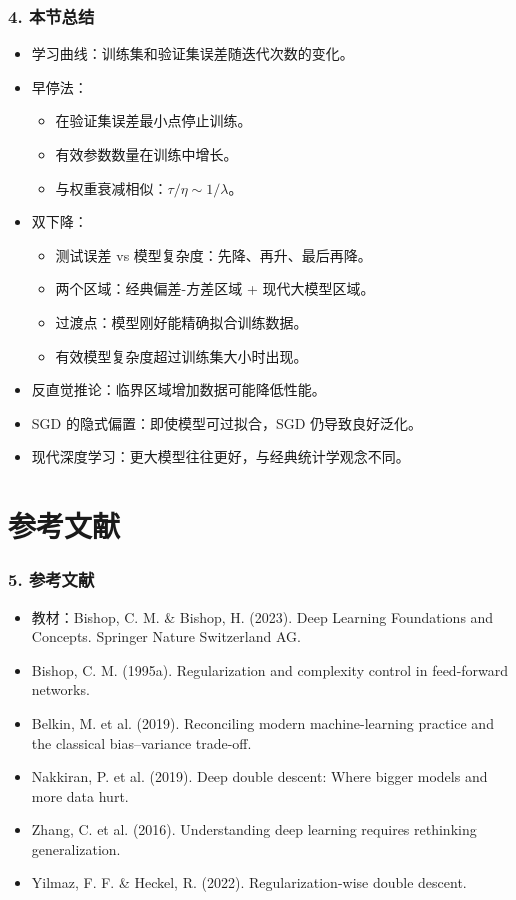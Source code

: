 \documentclass[t,aspectratio=169]{beamer} %
\begin{document}
\begin{frame}
    \frametitle{4. 本节总结}
    \begin{itemize}
        \item \alert{学习曲线}：训练集和验证集误差随迭代次数的变化。
        \item \alert{早停法}：
        \begin{itemize}
            \item 在验证集误差最小点停止训练。
            \item 有效参数数量在训练中增长。
            \item 与权重衰减相似：$\tau/\eta \sim 1/\lambda$。
        \end{itemize}
        \item \alert{双下降}：
        \begin{itemize}
            \item 测试误差 vs 模型复杂度：先降、再升、\alert{最后再降}。
            \item 两个区域：经典偏差-方差区域 + 现代大模型区域。
            \item 过渡点：模型刚好能\alert{精确拟合训练数据}。
            \item 有效模型复杂度超过训练集大小时出现。
        \end{itemize}
        \item \alert{反直觉推论}：临界区域增加数据可能降低性能。
        \item \alert{SGD 的隐式偏置}：即使模型可过拟合，SGD 仍导致良好泛化。
        \item 现代深度学习：\alert{更大模型往往更好}，与经典统计学观念不同。
    \end{itemize}
\end{frame}

\section{参考文献}

\begin{frame}
    \frametitle{5. 参考文献}
    \begin{itemize}
        \item 教材：Bishop, C. M. \& Bishop, H. (2023). Deep Learning Foundations and Concepts. Springer Nature Switzerland AG.
        \item Bishop, C. M. (1995a). Regularization and complexity control in feed-forward networks.
        \item Belkin, M. et al. (2019). Reconciling modern machine-learning practice and the classical bias--variance trade-off.
        \item Nakkiran, P. et al. (2019). Deep double descent: Where bigger models and more data hurt.
        \item Zhang, C. et al. (2016). Understanding deep learning requires rethinking generalization.
        \item Yilmaz, F. F. \& Heckel, R. (2022). Regularization-wise double descent.
    \end{itemize}
\end{frame}
\end{document}
